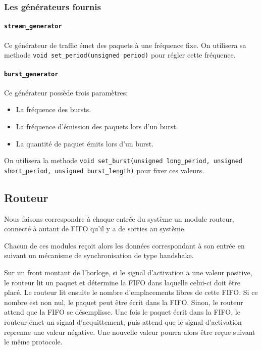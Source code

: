 \subsubsection{Les générateurs fournis}

\paragraph{\texttt{stream\_generator} \\}

Ce générateur de traffic émet des paquets à une fréquence fixe. On utilisera sa
methode \texttt{void set\_period(unsigned period)} pour régler cette fréquence.

\paragraph{\texttt{burst\_generator} \\}

Ce générateur possède trois paramètres:
\begin{itemize}
  \item La fréquence des bursts.
  \item La fréquence d'émission des paquets lors d'un burst.
  \item La quantité de paquet émits lors d'un burst.
\end{itemize}
On utilisera la methode \texttt{void set\_burst(unsigned long\_period, unsigned
short\_period, unsigned burst\_length)} pour fixer ces valeurs.

\subsection{Routeur}
Nous faisons correspondre à chaque entrée du système un module routeur, connecté
à autant de FIFO qu'il y a de sorties au système.

Chacun de ces modules reçoit alors les données correspondant à son entrée en
suivant un mécanisme de synchronisation de type handshake.

Sur un front montant de l'horloge, si le signal d'activation a une valeur positive,
le routeur lit un paquet et détermine la FIFO dans laquelle celui-ci doit être placé.
Le routeur lit ensuite le nombre d'emplacements libres de cette FIFO.
Si ce nombre est non nul, le paquet peut être écrit dans la FIFO.
Sinon, le routeur attend que la FIFO se désemplisse.
Une fois le paquet écrit dans la FIFO, le routeur émet un signal d'acquittement,
puis attend que le signal d'activation reprenne une valeur négative.
Une nouvelle valeur pourra alors être reçue suivant le même protocole.

